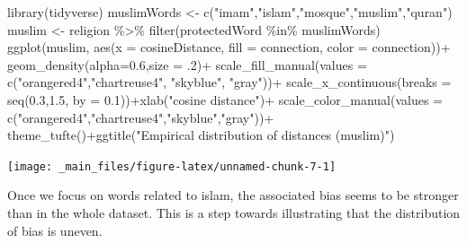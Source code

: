 \documentclass[
  12pt,
]{book}
\newenvironment{Shaded}{\begin{snugshade}}{\end{snugshade}}
\newcommand{\AttributeTok}[1]{\textcolor[rgb]{0.77,0.63,0.00}{#1}}
\newcommand{\DecValTok}[1]{\textcolor[rgb]{0.00,0.00,0.81}{#1}}
\newcommand{\FloatTok}[1]{\textcolor[rgb]{0.00,0.00,0.81}{#1}}
\newcommand{\FunctionTok}[1]{\textcolor[rgb]{0.00,0.00,0.00}{#1}}
\newcommand{\NormalTok}[1]{#1}
\newcommand{\OtherTok}[1]{\textcolor[rgb]{0.56,0.35,0.01}{#1}}
\newcommand{\SpecialCharTok}[1]{\textcolor[rgb]{0.00,0.00,0.00}{#1}}
\newcommand{\StringTok}[1]{\textcolor[rgb]{0.31,0.60,0.02}{#1}}
\begin{document}
\begin{Shaded}
\begin{Highlighting}[]
\FunctionTok{library}\NormalTok{(tidyverse)}
\NormalTok{muslimWords }\OtherTok{\textless{}{-}} \FunctionTok{c}\NormalTok{(}\StringTok{"imam"}\NormalTok{,}\StringTok{"islam"}\NormalTok{,}\StringTok{"mosque"}\NormalTok{,}\StringTok{"muslim"}\NormalTok{,}\StringTok{"quran"}\NormalTok{)}
\NormalTok{muslim }\OtherTok{\textless{}{-}}\NormalTok{ religion }\SpecialCharTok{\%\textgreater{}\%} \FunctionTok{filter}\NormalTok{(protectedWord }\SpecialCharTok{\%in\%}\NormalTok{ muslimWords)}
\FunctionTok{ggplot}\NormalTok{(muslim, }\FunctionTok{aes}\NormalTok{(}\AttributeTok{x =}\NormalTok{  cosineDistance, }\AttributeTok{fill =}\NormalTok{ connection, }\AttributeTok{color =}\NormalTok{ connection))}\SpecialCharTok{+}
  \FunctionTok{geom\_density}\NormalTok{(}\AttributeTok{alpha=}\FloatTok{0.6}\NormalTok{,}\AttributeTok{size =}\NormalTok{ .}\DecValTok{2}\NormalTok{)}\SpecialCharTok{+} 
  \FunctionTok{scale\_fill\_manual}\NormalTok{(}\AttributeTok{values =} \FunctionTok{c}\NormalTok{(}\StringTok{"orangered4"}\NormalTok{,}\StringTok{"chartreuse4"}\NormalTok{, }\StringTok{"skyblue"}\NormalTok{, }\StringTok{"gray"}\NormalTok{))}\SpecialCharTok{+}
  \FunctionTok{scale\_x\_continuous}\NormalTok{(}\AttributeTok{breaks =} \FunctionTok{seq}\NormalTok{(}\FloatTok{0.3}\NormalTok{,}\FloatTok{1.5}\NormalTok{, }\AttributeTok{by =} \FloatTok{0.1}\NormalTok{))}\SpecialCharTok{+}\FunctionTok{xlab}\NormalTok{(}\StringTok{"cosine distance"}\NormalTok{)}\SpecialCharTok{+}
  \FunctionTok{scale\_color\_manual}\NormalTok{(}\AttributeTok{values =} \FunctionTok{c}\NormalTok{(}\StringTok{"orangered4"}\NormalTok{,}\StringTok{"chartreuse4"}\NormalTok{,}\StringTok{"skyblue"}\NormalTok{,}\StringTok{"gray"}\NormalTok{))}\SpecialCharTok{+}
  \FunctionTok{theme\_tufte}\NormalTok{()}\SpecialCharTok{+}\FunctionTok{ggtitle}\NormalTok{(}\StringTok{"Empirical distribution of distances (muslim)"}\NormalTok{)}
\end{Highlighting}
\end{Shaded}

\begin{center}\texttt{[image: \_main\_files/figure-latex/unnamed-chunk-7-1]} \end{center}
\normalsize

\noindent Once we focus on words related to islam, the associated bias seems to be stronger than in the whole dataset. This is a step towards illustrating that the distribution of bias is uneven.
\end{document}
